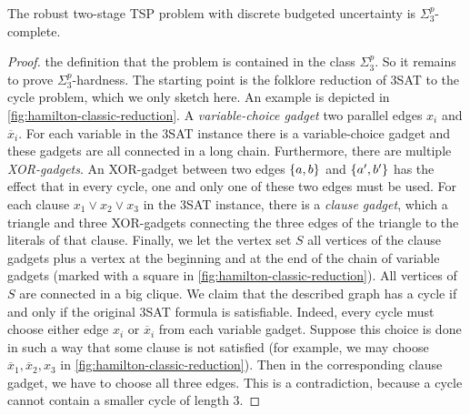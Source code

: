 \begin{theorem}
\label{thm:discr-two-stage-tsp}
The robust two-stage TSP problem with discrete budgeted uncertainty is $\Sigma_3^p$-complete.
\end{theorem}
\begin{proof}
 the definition that the problem is contained in the class $\Sigma_3^p$. So it remains to prove $\Sigma_3^p$-hardness.
The starting point is the folklore reduction of 3SAT to the  cycle problem, which we only sketch here. An example is depicted in \cref{fig:hamilton-classic-reduction}.
A \emph{variable-choice gadget}  two parallel edges $x_i$ and $\overline x_i$.
For each variable in the 3SAT instance there is a variable-choice gadget and these gadgets are all connected in a long chain. 
Furthermore, there are multiple \emph{XOR-gadgets}. An XOR-gadget between two edges $\{ a,b \}$ and $\{ a',b' \}$ has the effect that in every  cycle, one and only one of these two edges must be used.
For each clause $x_1 \lor x_2 \lor x_3$ in the 3SAT instance, there is a \emph{clause gadget}, which  a triangle and three XOR-gadgets connecting the three edges of the triangle to the literals of that clause.
Finally, we let the vertex set $S$  all vertices of the clause gadgets plus a vertex at the beginning and at the end of the chain of variable gadgets (marked with a square in \cref{fig:hamilton-classic-reduction}).
All vertices of $S$ are connected in a big clique.
We claim that the described graph has a  cycle if and only if the original 3SAT formula is satisfiable. Indeed, every  cycle must choose either edge $x_i$ or $\overline x_i$ from each variable gadget.
Suppose this choice is done in such a way that some clause is not satisfied (for example, we may choose $\overline x_1, \overline{x}_2, x_3$ in \cref{fig:hamilton-classic-reduction}). 
Then in the corresponding clause gadget, we have to choose all three edges. This is a contradiction, because a  cycle cannot contain a smaller cycle of length 3.
 

\end{proof}
